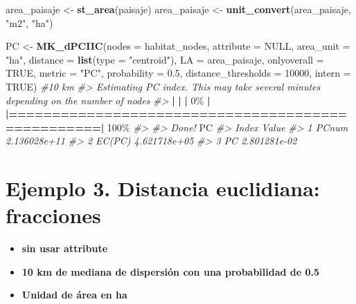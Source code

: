 \documentclass[
]{book}
\newenvironment{Shaded}{\begin{snugshade}}{\end{snugshade}}
\newcommand{\AttributeTok}[1]{\textcolor[rgb]{0.13,0.29,0.53}{#1}}
\newcommand{\CommentTok}[1]{\textcolor[rgb]{0.56,0.35,0.01}{\textit{#1}}}
\newcommand{\ConstantTok}[1]{\textcolor[rgb]{0.56,0.35,0.01}{#1}}
\newcommand{\DecValTok}[1]{\textcolor[rgb]{0.00,0.00,0.81}{#1}}
\newcommand{\ErrorTok}[1]{\textcolor[rgb]{0.64,0.00,0.00}{\textbf{#1}}}
\newcommand{\FloatTok}[1]{\textcolor[rgb]{0.00,0.00,0.81}{#1}}
\newcommand{\FunctionTok}[1]{\textcolor[rgb]{0.13,0.29,0.53}{\textbf{#1}}}
\newcommand{\NormalTok}[1]{#1}
\newcommand{\OtherTok}[1]{\textcolor[rgb]{0.56,0.35,0.01}{#1}}
\newcommand{\SpecialCharTok}[1]{\textcolor[rgb]{0.81,0.36,0.00}{\textbf{#1}}}
\newcommand{\StringTok}[1]{\textcolor[rgb]{0.31,0.60,0.02}{#1}}
\providecommand{\tightlist}{%
  \setlength{\itemsep}{0pt}\setlength{\parskip}{0pt}}
\begin{document}
\begin{Shaded}
\begin{Highlighting}[]
\NormalTok{area\_paisaje }\OtherTok{\textless{}{-}} \FunctionTok{st\_area}\NormalTok{(paisaje) }
\NormalTok{area\_paisaje }\OtherTok{\textless{}{-}} \FunctionTok{unit\_convert}\NormalTok{(area\_paisaje, }\StringTok{"m2"}\NormalTok{, }\StringTok{"ha"}\NormalTok{) }

\NormalTok{PC }\OtherTok{\textless{}{-}} \FunctionTok{MK\_dPCIIC}\NormalTok{(}\AttributeTok{nodes =}\NormalTok{ habitat\_nodes,}
                \AttributeTok{attribute =} \ConstantTok{NULL}\NormalTok{,}
                \AttributeTok{area\_unit =} \StringTok{"ha"}\NormalTok{,}
                \AttributeTok{distance =} \FunctionTok{list}\NormalTok{(}\AttributeTok{type =} \StringTok{"centroid"}\NormalTok{),}
                \AttributeTok{LA =}\NormalTok{ area\_paisaje,}
                \AttributeTok{onlyoverall =} \ConstantTok{TRUE}\NormalTok{,}
                \AttributeTok{metric =} \StringTok{"PC"}\NormalTok{,}
                \AttributeTok{probability =} \FloatTok{0.5}\NormalTok{,}
                \AttributeTok{distance\_thresholds =} \DecValTok{10000}\NormalTok{,}
                \AttributeTok{intern =} \ConstantTok{TRUE}\NormalTok{) }\CommentTok{\#10 km}
\CommentTok{\#\textgreater{} Estimating PC index. This may take several minutes depending on the number of nodes}
\CommentTok{\#\textgreater{} }
  \SpecialCharTok{|}                                                        
  \ErrorTok{|}                                                  \ErrorTok{|}   \DecValTok{0}\NormalTok{\%}
  \SpecialCharTok{|}                                                        
  \ErrorTok{|==================================================|} \DecValTok{100}\NormalTok{\%}
\CommentTok{\#\textgreater{} }
\CommentTok{\#\textgreater{} Done!}
\NormalTok{PC}
\CommentTok{\#\textgreater{}    Index        Value}
\CommentTok{\#\textgreater{} 1  PCnum 2.136028e+11}
\CommentTok{\#\textgreater{} 2 EC(PC) 4.621718e+05}
\CommentTok{\#\textgreater{} 3     PC 2.801281e{-}02}
\end{Highlighting}
\end{Shaded}

\section{Ejemplo 3. Distancia euclidiana: fracciones}\label{ejemplo-3.-distancia-euclidiana-fracciones}

\begin{itemize}
\tightlist
\item
  \textbf{sin usar attribute}
\item
  \textbf{10 km de mediana de dispersión con una probabilidad de 0.5}
\item
  \textbf{Unidad de área en ha}
\end{itemize}
\end{document}
